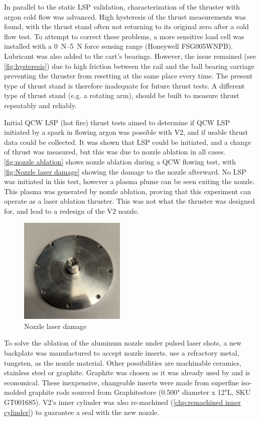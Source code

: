 In parallel to the static LSP validation, characterization of the thruster with argon cold flow was advanced. High hysteresis of the thrust measurements was found, with the thrust stand often not returning to its original zero after a cold flow test. To attempt to correct these problems, a more sensitive load cell was installed with a \qtyrange{0}{5}{N} force sensing range (Honeywell FSG005WNPB). Lubricant was also added to the cart's bearings. However, the issue remained (see \autoref{fig:hysteresis}) due to high friction between the rail and the ball bearing carriage preventing the thruster from resetting at the same place every time. The present type of thrust stand is therefore inadequate for future thrust tests. A different type of thrust stand (e.g. a rotating arm), should be built to measure thrust repeatably and reliably.

Initial QCW LSP (hot fire) thrust tests aimed to determine if QCW LSP initiated by a spark in flowing argon was possible with V2, and if usable thrust data could be collected. It was shown that LSP could be initiated, and a change of thrust was measured, but this was due to nozzle ablation in all cases. \autoref{fig:nozzle ablation} shows nozzle ablation during a QCW flowing test, with \autoref{fig:Nozzle laser damage} showing the damage to the nozzle afterward. No LSP was initiated in this test, however a plasma plume can be seen exiting the nozzle. This plasma was generated by nozzle ablation, proving that this experiment can operate as a laser ablation thruster. This was not what the thruster was designed for, and lead to a redesign of the V2 nozzle.
\begin{figure}[!ht]
    \centering
    \includegraphics[width=0.45\textwidth]{assets/4 experiments/Nozzle damage.jpg}
    \caption{Nozzle laser damage}
    \label{fig:Nozzle laser damage}
\end{figure}
To solve the ablation of the aluminum nozzle under pulsed laser shots, a new backplate was manufactured to accept nozzle inserts. \textcite{toyodaThrustPerformanceCW2002} use a refractory metal, tungsten, as the nozzle material. Other possibilities are machinable ceramics, stainless steel or graphite. Graphite was chosen as it was already used by \textcite{shojiLaserheatedRocketThruster1977} and is economical. These inexpensive, changeable inserts were made from superfine iso-molded graphite rods sourced from Graphitestore (0.500" diameter x 12"L, SKU GT001685). V2's inner cylinder was also re-machined (\autoref{chp:remachined inner cylinder}) to guarantee a seal with the new nozzle.

